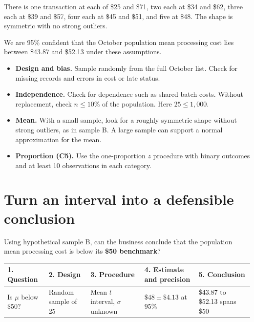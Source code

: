 There is one transaction at each of \$25 and \$71, two each at \$34 and \$62, three each at \$39 and \$57, four each at \$45 and \$51, and five at \$48. The shape is symmetric with no strong outliers.

We are 95\% confident that the October population mean processing cost lies between \$43.87 and \$52.13 under these assumptions.
\begin{itemize}
  \item \textbf{Design and bias.} Sample randomly from the full October list. Check for missing records and errors in cost or late status.
  \item \textbf{Independence.} Check for dependence such as shared batch costs. Without replacement, check \(n\le 10\%\) of the population. Here \(25\le 1{,}000\).
  \item \textbf{Mean.} With a small sample, look for a roughly symmetric shape without strong outliers, as in sample B. A large sample can support a normal approximation for the mean.
  \item \textbf{Proportion (C5).} Use the one-proportion \(z\) procedure with binary outcomes and at least 10 observations in each category.
\end{itemize}


\section{Turn an interval into a defensible conclusion}

Using hypothetical sample B, can the business conclude that the population mean processing cost is below its \textbf{\$50 benchmark}?


{\small\noindent
\begin{tabularx}{\linewidth}{@{}YYYYY@{}}
  \toprule
  \textbf{1. Question} & \textbf{2. Design} & \textbf{3. Procedure}
    & \textbf{4. Estimate and precision} & \textbf{5. Conclusion}\\
  \midrule
  Is \(\mu\) below \$50? & Random sample of 25 & Mean \(t\) interval, \(\sigma\) unknown
    & \(\$48\pm \$4.13\) at 95\% & \$43.87 to \$52.13 spans \$50\\
  \bottomrule
\end{tabularx}\par}

